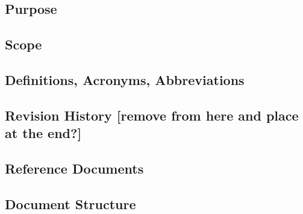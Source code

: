 \subsection{Purpose}
\label{sect:introduction:purpose}


\subsection{Scope}
\label{sect:introduction:scope}


\subsection{Definitions, Acronyms, Abbreviations}
\label{sect:introduction:description}


\subsection{Revision History [remove from here and place at the end?]}
\label{sect:introduction:revhistory}


\subsection{Reference Documents}
\label{sect:introduction:refdocs}


\subsection{Document Structure}
\label{sect:introduction:docstructure}
